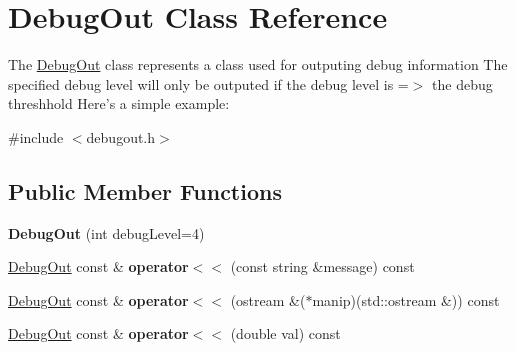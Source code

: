 \hypertarget{classDebugOut}{\section{Debug\+Out Class Reference}
\label{classDebugOut}
}


The \hyperlink{classDebugOut}{Debug\+Out} class represents a class used for outputing debug information The specified debug level will only be outputed if the debug level is =$>$ the debug threshhold Here's a simple example\+:  




{\ttfamily \#include $<$debugout.\+h$>$}

\subsection*{Public Member Functions}
\begin{DoxyCompactItemize}
\item 
\hypertarget{classDebugOut_a833f5ea5ab0d98d3fdf4a1ed8efed770}{{\bfseries Debug\+Out} (int debug\+Level=4)}\label{classDebugOut_a833f5ea5ab0d98d3fdf4a1ed8efed770}

\item 
\hypertarget{classDebugOut_aa35622f0f1b15060ad0f281de6e799b3}{\hyperlink{classDebugOut}{Debug\+Out} const \& {\bfseries operator$<$$<$} (const string \&message) const }\label{classDebugOut_aa35622f0f1b15060ad0f281de6e799b3}

\item 
\hypertarget{classDebugOut_a0b83635c229210d6000b9663575bbe99}{\hyperlink{classDebugOut}{Debug\+Out} const \& {\bfseries operator$<$$<$} (ostream \&($\ast$manip)(std\+::ostream \&)) const }\label{classDebugOut_a0b83635c229210d6000b9663575bbe99}

\item 
\hypertarget{classDebugOut_a9ab6e54c6f70bcbf18faf329952b5998}{\hyperlink{classDebugOut}{Debug\+Out} const \& {\bfseries operator$<$$<$} (double val) const }\label{classDebugOut_a9ab6e54c6f70bcbf18faf329952b5998}

\end{DoxyCompactItemize}
